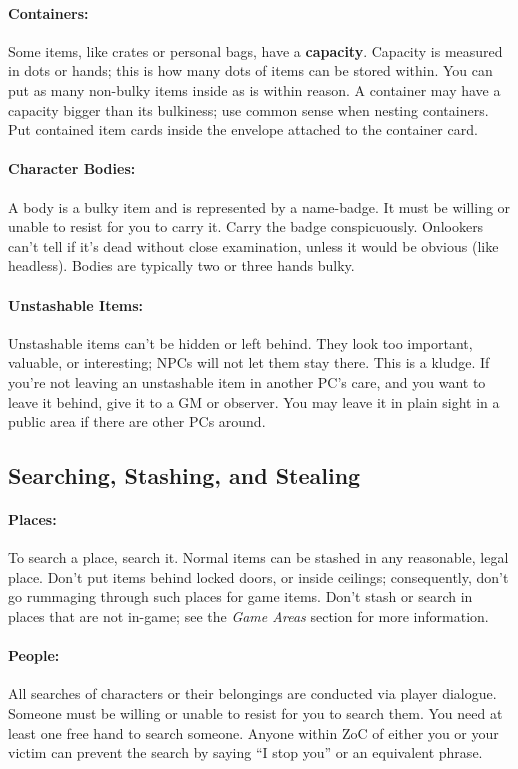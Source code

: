 \documentclass[sheet]{airship}
\begin{document}
\paragraph{Containers:} Some items, like crates or personal bags, have
a {\bf capacity}.  Capacity is measured in dots or hands; this is how
many dots of items can be stored within.  You can put as many
non-bulky items inside as is within reason.  A container may have a
capacity bigger than its bulkiness; use common sense when nesting
containers.  Put contained item cards inside the envelope attached to
the container card.

\paragraph{Character Bodies:} A body is a bulky item and is 
represented by a name-badge.  It must be willing or unable to resist
for you to carry it.  Carry the badge conspicuously.  Onlookers can't
tell if it's dead without close examination, unless it would be
obvious (like headless). Bodies are typically two or three hands bulky.

\paragraph{Unstashable Items:} Unstashable items can't be hidden or
left behind.  They look too important, valuable, or interesting; NPCs
will not let them stay there.  This is a kludge.  If you're not
leaving an unstashable item in another PC's care, and you want to
leave it behind, give it to a GM or observer.  You may leave it in
plain sight in a public area if there are other PCs around.

\subsection{Searching, Stashing, and Stealing}

\paragraph{Places:} To search a place, search it.  Normal items can be
stashed in any reasonable, legal place.  Don't put items behind locked
doors, or inside ceilings; consequently, don't go rummaging through such places for
game items.  Don't stash or search in places that are not in-game; see
the {\em Game Areas} section for more information.

\paragraph{People:} All searches of characters or their belongings are
conducted via player dialogue.  Someone must be willing or unable to
resist for you to search them.  You need at least one free hand to
search someone.  Anyone within ZoC of either you or your victim can
prevent the search by saying ``I stop you'' or an equivalent phrase.
\end{document}
